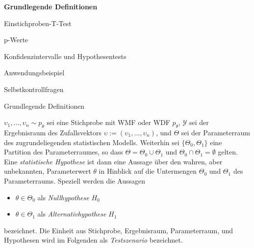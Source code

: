 \documentclass[
  8pt,
  ignorenonframetext,
]{beamer}
\newcommand{\ups} {\upsilon}
\begin{document}
\begin{frame}{}
\protect\hypertarget{section-7}{}
\large
\vfill

\textbf{Grundlegende Definitionen}

Einstichproben-T-Test

p-Werte

Konfidenzintervalle und Hypothesentests

Anwendungsbeispiel

Selbstkontrollfragen \vfill
\end{frame}

\begin{frame}{Grundlegende Definitionen}
\protect\hypertarget{grundlegende-definitionen}{}
\small
\begin{definition}
\justifying
$\ups_1,...,\ups_n \sim p_\theta$ sei eine Stichprobe mit WMF oder WDF $p_\theta$,
$\mathcal{Y}$ sei der Ergebnisraum des Zufallsvektors $\ups := (\ups_1,...,\ups_n)$, und
$\Theta$ sei der Parameterraum des zugrundeliegenden statistischen Modells.
Weiterhin sei $\{\Theta_0,\Theta_1\}$ eine Partition des Parameterraumes, so
dass $\Theta = \Theta_0 \cup \Theta_1$ und $\Theta_0 \cap \Theta_1 = \emptyset$
gelten. Eine \textit{statistische Hypothese} ist dann eine Aussage über den
wahren, aber unbekannten, Parameterwert $\theta$ in Hinblick auf die Untermengen
$\Theta_0$ und $\Theta_1$ des Parameterraums. Speziell werden die Aussagen
\begin{itemize}
\item $\theta \in \Theta_0$ als \textit{Nullhypothese} $H_0$
\item $\theta \in \Theta_1$ als \textit{Alternativhypothese} $H_1$
\end{itemize}
bezeichnet. Die Einheit aus Stichprobe, Ergebnisraum, Parameterraum, und
Hypothesen wird im Folgenden als \textit{Testszenario} bezeichnet.
\end{definition}
\end{frame}
\end{document}
